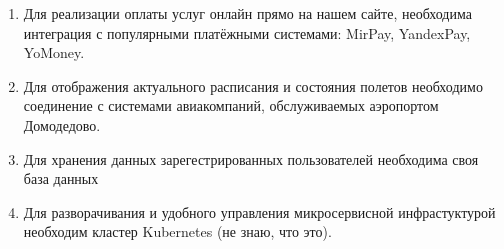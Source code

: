 
\begin{enumerate}
      \item Для реализации оплаты услуг онлайн прямо
            на нашем сайте, необходима интеграция с 
            популярными платёжными системами: 
            MirPay, YandexPay, YoMoney.
            
      \item Для отображения актуального
            расписания и состояния полетов необходимо 
            соединение с системами авиакомпаний, 
            обслуживаемых аэропортом Домодедово.
            
      \item Для хранения данных зарегестрированных 
            пользователей необходима своя база данных

      \item Для разворачивания и удобного управления 
            микросервисной инфрастуктурой необходим 
            кластер Kubernetes (не знаю, что это).
\end{enumerate}

